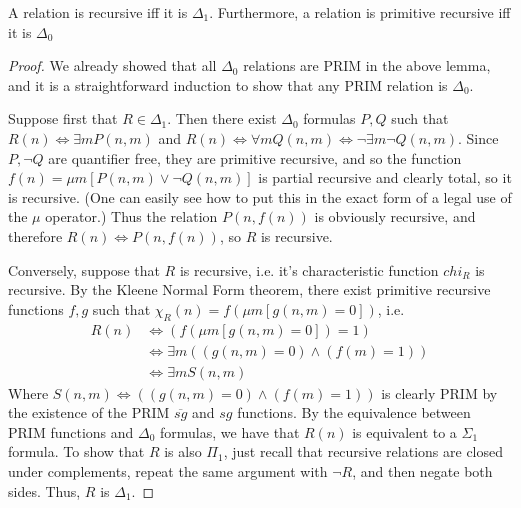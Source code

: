 \begin{theorem}
    A relation is recursive iff it is $\Delta_1$. Furthermore, a relation is primitive recursive iff it is $\Delta_0$
\end{theorem}
\begin{proof}
    \par We already showed that all $\Delta_0$ relations are PRIM in the above lemma, and it is a straightforward induction to show that any PRIM relation is $\Delta_0$.
    \par Suppose first that $R \in \Delta_1$. Then there exist $\Delta_0$ formulas $P,Q$ such that $R(n) \iff \exists m P(n,m)$ and $R(n) \iff \forall m Q(n,m) \iff \neg \exists m \neg Q(n,m)$. Since $P,\neg Q$ are quantifier free, they are primitive recursive, and so the function $f(n) = \mu m [P(n,m) \vee \neg Q(n,m)]$ is partial recursive and clearly total, so it is recursive. (One can easily see how to put this in the exact form of a legal use of the $\mu$ operator.) Thus the relation $P(n,f(n))$ is obviously recursive, and therefore $R(n) \iff P(n,f(n))$, so $R$ is recursive.
    \par Conversely, suppose that $R$ is recursive, i.e. it's characteristic function $chi_R$ is recursive. By the Kleene Normal Form theorem, there exist primitive recursive functions $f,g$ such that $\chi_R(n) = f(\mu m [g(n,m)=0])$, i.e.
    \begin{align}
        R(n) &\iff (f(\mu m [g(n,m)=0]) = 1) \\
             &\iff \exists m ((g(n,m) = 0) \wedge (f(m) = 1)) \\
             &\iff \exists m S(n,m)
    \end{align}
    Where $S(n,m) \iff ((g(n,m) = 0) \wedge (f(m) = 1))$ is clearly PRIM by the existence of the PRIM $\overline{sg}$ and $sg$ functions. By the equivalence between PRIM functions and $\Delta_0$ formulas, we have that $R(n)$ is equivalent to a $\Sigma_1$ formula. To show that $R$ is also $\Pi_1$, just recall that recursive relations are closed under complements, repeat the same argument with $\neg R$, and then negate both sides. Thus, $R$ is $\Delta_1$.
\end{proof}
